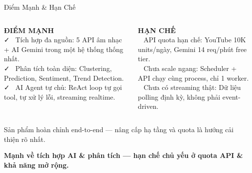 \documentclass[aspectratio=169,9pt]{beamer}
\newcommand{\takeaway}[1]{%
  \vfill
  \begin{mdframed}[
    linecolor=maccent, linewidth=1.5pt,
    backgroundcolor=mlightgold,
    innertopmargin=5pt, innerbottommargin=5pt,
    innerleftmargin=10pt, innerrightmargin=10pt,
    roundcorner=3pt, skipabove=4pt, skipbelow=0pt
  ]
  \centering\small\bfseries\color{mprimary} #1
  \end{mdframed}%
}
\begin{document}
\begin{frame}{Điểm Mạnh \& Hạn Chế}

\begin{columns}[T]
\begin{goodbox}
  \textbf{ĐIỂM MẠNH}\\[6pt]
  \footnotesize
  \faCheck~ Tích hợp đa nguồn: 5 API âm nhạc + AI Gemini trong một hệ thống thống nhất.\\[6pt]
  \faCheck~ Phân tích toàn diện: Clustering, Prediction, Sentiment, Trend Detection.\\[6pt]
  \faCheck~ AI Agent tự chủ: ReAct loop tự gọi tool, tự xử lý lỗi, streaming realtime.
\end{goodbox}

\begin{badbox}
  \textbf{HẠN CHẾ}\\[6pt]
  \footnotesize
  \faTimes~ API quota hạn chế: YouTube 10K units/ngày, Gemini 14 req/phút free tier.\\[6pt]
  \faTimes~ Chưa scale ngang: Scheduler + API chạy cùng process, chỉ 1 worker.\\[6pt]
  \faTimes~ Chưa có streaming thật: Dữ liệu polling định kỳ, không phải event-driven.
\end{badbox}
\end{columns}

\vspace{0.4cm}
\begin{primarybox}
  \centering\footnotesize
  Sản phẩm hoàn chỉnh end-to-end — nâng cấp hạ tầng và quota là hướng cải thiện rõ nhất.
\end{primarybox}

\takeaway{Mạnh về tích hợp AI \& phân tích — hạn chế chủ yếu ở quota API \& khả năng mở rộng.}

\end{frame}
\end{document}
